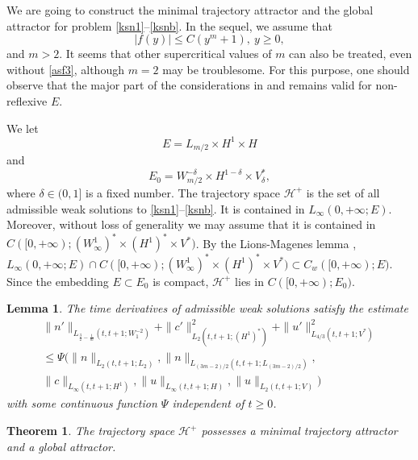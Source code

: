 \documentclass[10pt]{amsart}
\newtheorem {theorem} {Theorem} [section]
\newtheorem {lemma} {Lemma} [section]
\begin{document}
We are going to construct the minimal trajectory attractor
and the global attractor for problem \eqref{ksn1}--\eqref{ksnb}. In the sequel, we assume that \begin{equation}\label{asf3} |f(y)|\leq C(y^m + 1),\ y\geq 0, \end{equation} and $m>2.$ It seems that other supercritical values of $m$ can also be treated, even without \eqref{asf3}, although $m=2$ may be troublesome.  For this purpose, one should observe that the major part of the considerations in \cite[Chapter 4]{book} and \cite{jde11} remains valid for non-reflexive $E$. 

We let  $$E=L_{m/2} \times H^1 \times H$$ and
$$E_0=W_{m/2}^{-\delta} \times H^{1-\delta} \times V_\delta ^*,$$ where $ \delta \in (0,1] $ is a fixed
number. The trajectory space $ \mathcal {H}
^ + $ is the set of all admissible weak solutions to \eqref{ksn1}--\eqref{ksnb}. It is contained in $L_\infty (0, + \infty; E) $. Moreover, without loss of generality we may assume that it is contained in $C ([0, + \infty); (W^1_\infty)^* \times (H^{1})^* \times V^*) $. By the Lions-Magenes lemma \cite[Lemma 2.2.6]{book}, $L_\infty (0, + \infty; E) \cap C ([0, + \infty); (W^1_\infty)^* \times (H^{1})^* \times V^*) \subset C_w ([0, + \infty); E)$.  Since the embedding $E\subset E_0$ is compact, $ \mathcal {H}
^ + $ lies in $C ([0, + \infty); E_0) $. 

\begin{lemma}The time derivatives of admissible weak solutions satisfy the estimate 
\begin{multline}\label{difest}\|n'\|_{L_{\frac 32 - \frac 1m}(t,t+1;W_1^{-2})}+\|c'\|_{L_{2}(t,t+1;(H^1)^*)}^2+\|u'\|_{L_{4/3}(t,t+1;V^*)}^2 \\ \leq \Psi(\|n\|_{L_{2}(t,t+1;L_2)}, \|n\|_{L_{(3m-2)/2}(t,t+1;L_{(3m-2)/2})}, \\ \|c\|_{L_{\infty}(t,t+1;H^1)},\|u\|_{L_{\infty}(t,t+1;H)},\|u\|_{L_{2}(t,t+1;V)})\end{multline} with some continuous function $\Psi$ independent of $t\geq 0$. \end{lemma}

\begin{theorem} \label{ma1}  The trajectory space $ \mathcal {H} ^ + $ possesses a minimal trajectory attractor and a global attractor. 
\end{theorem}
\end{document}
